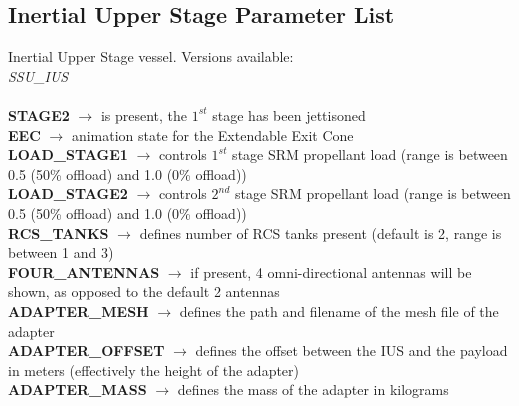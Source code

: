 \documentclass[Space_Shuttle_Ultra_Manual.tex]{subfiles}
\begin{document}
\begin{multicols*}{2}
\subsection{Inertial Upper Stage Parameter List}
\noindent
Inertial Upper Stage vessel. Versions available:
\\
\textit{SSU\_IUS}
\\
\\
\textbf{STAGE2} $\rightarrow$ is present, the $1^{st}$ stage has been jettisoned
\\
\textbf{EEC} $\rightarrow$ animation state for the Extendable Exit Cone
\\
\textbf{LOAD\_STAGE1} $\rightarrow$ controls $1^{st}$ stage SRM propellant load (range is between 0.5 (50\% offload) and 1.0 (0\% offload))
\\
\textbf{LOAD\_STAGE2} $\rightarrow$ controls $2^{nd}$ stage SRM propellant load (range is between 0.5 (50\% offload) and 1.0 (0\% offload))
\\
\textbf{RCS\_TANKS} $\rightarrow$ defines number of RCS tanks present (default is 2, range is between 1 and 3)
\\
\textbf{FOUR\_ANTENNAS} $\rightarrow$ if present, 4 omni-directional antennas will be shown, as opposed to the default 2 antennas
\\
\textbf{ADAPTER\_MESH} $\rightarrow$ defines the path and filename of the mesh file of the adapter
\\
\textbf{ADAPTER\_OFFSET} $\rightarrow$ defines the offset between the IUS and the payload in meters (effectively the height of the adapter)
\\
\textbf{ADAPTER\_MASS} $\rightarrow$ defines the mass of the adapter in kilograms

\end{multicols*}
\end{document}
